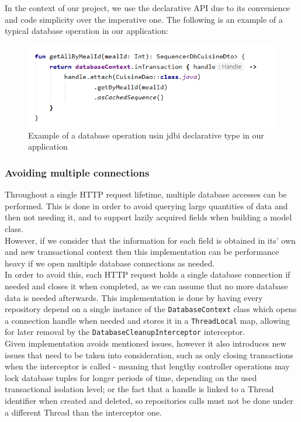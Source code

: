 In the context of our project, we use the declarative API due to its convenience and code simplicity over the
imperative one. The following is an example of a typical database operation in our application:\

\begin{figure}[H]
    \begin{center}
        \includegraphics[scale=0.8]{_figures/jdbi-nutrio.png}
        \caption{Example of a database operation usin jdbi declarative type in our application}
    \end{center}
\end{figure}

\subsubsection{Avoiding multiple connections}

Throughout a single HTTP request lifetime, multiple database accesses can be performed. This is done in order to avoid querying
large quantities of data and then not needing it, and to support lazily acquired fields when building a model class.\\

However, if we consider that the information for each field is obtained in its' own and new transactional context then this
implementation can be performance heavy if we open multiple database connections as needed.\\

In order to avoid this, each HTTP request holds a single database connection if needed and closes it when completed, as we
can assume that no more database data is needed afterwards. This implementation is done by having every repository depend on
a single instance of the \texttt{DatabaseContext} class which opens a connection handle when needed and stores it in a 
\texttt{ThreadLocal} map, allowing for later removal by the \texttt{DatabaseCleanupInterceptor} interceptor.\\

Given implementation avoids mentioned issues, however it also introduces new issues that need to be taken into consideration,
such as only closing transactions when the interceptor is called - meaning that lengthy controller operations may lock database
tuples for longer periods of time, depending on the used transactional isolation level;  or the fact that a handle is linked to
a Thread identifier when created and deleted, so repositories calls must not be done under a different Thread than the interceptor one.\\

